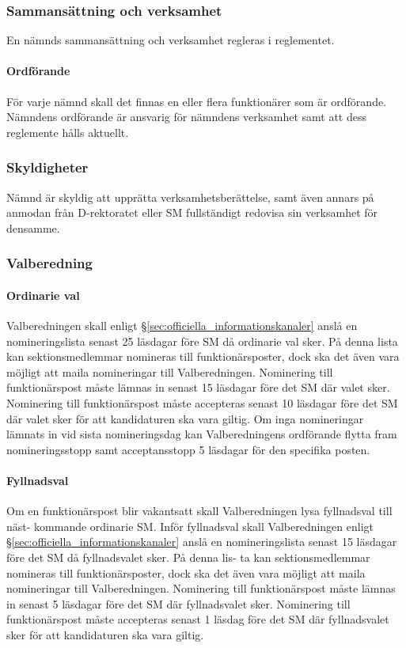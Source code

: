 \documentclass{dgovdoc}
\begin{document}
\subsubsection{Sammansättning och verksamhet}

En nämnds sammansättning och verksamhet regleras i reglementet.

\paragraph{Ordförande}

För varje nämnd skall det finnas en eller flera funktionärer som är ordförande.
Nämndens ordförande är ansvarig för nämndens verksamhet samt att dess
reglemente hålls aktuellt.

\subsubsection{Skyldigheter}

Nämnd är skyldig att upprätta verksamhetsberättelse, samt även annars på
anmodan från D-rektoratet eller SM fullständigt redovisa sin verksamhet för
densamme.

\subsubsection{Valberedning}

\paragraph{Ordinarie val}
Valberedningen skall enligt \S\ref{sec:officiella_informationskanaler} anslå en nomineringslista senast 25 läsdagar före SM
då ordinarie val sker. På denna lista kan sektionsmedlemmar nomineras till funktionärsposter, dock ska det även vara möjligt att maila nomineringar till Valberedningen. Nominering till funktionärspost måste lämnas in senast 15 läsdagar före det SM där valet sker. Nominering till funktionärspost måste accepteras senast 10 läsdagar före det SM där valet sker för att kandidaturen ska vara giltig.
Om inga nomineringar lämnats in vid sista nomineringsdag kan Valberedningens ordförande flytta fram nomineringsstopp samt acceptansstopp 5 läsdagar för den specifika posten.

\paragraph{Fyllnadsval}
Om en funktionärspost blir vakantsatt skall Valberedningen lysa fyllnadsval till näst-
kommande ordinarie SM. Inför fyllnadsval skall Valberedningen enligt \S\ref{sec:officiella_informationskanaler} anslå en
nomineringslista senast 15 läsdagar före det SM då fyllnadsvalet sker. På denna lis-
ta kan sektionsmedlemmar nomineras till funktionärsposter, dock ska det även vara
möjligt att maila nomineringar till Valberedningen.
Nominering till funktionärspost måste lämnas in senast 5 läsdagar före det SM där
fyllnadsvalet sker. Nominering till funktionärspost måste accepteras senast 1 läsdag
före det SM där fyllnadsvalet sker för att kandidaturen ska vara giltig.
\end{document}
